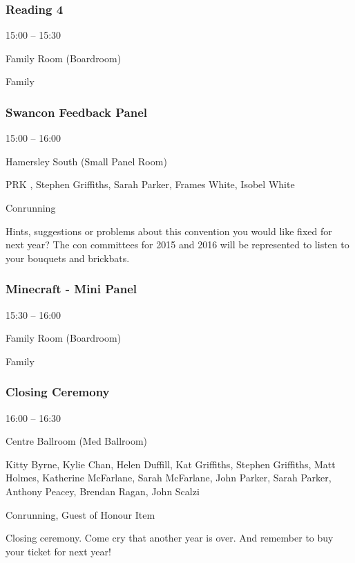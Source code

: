 \documentclass{scrreprt}
\begin{document}
\begin{multicols}{2}
\subsubsection*{Reading 4}\begin{description}
\setlength{\itemsep}{0pt}
\setlength{\parsep}{0pt}
\setlength{\parskip}{0pt}
\item[Time:]{15:00 -- 15:30}
\item[Venue:]{Family Room (Boardroom)}
\item[Tags:]{Family}\end{description}

\subsubsection*{Swancon Feedback Panel}\begin{description}
\setlength{\itemsep}{0pt}
\setlength{\parsep}{0pt}
\setlength{\parskip}{0pt}
\item[Time:]{15:00 -- 16:00}
\item[Venue:]{Hamersley South (Small Panel Room)}
\item[People:]{PRK , Stephen Griffiths, Sarah Parker, Frames White, Isobel White}
\item[Tags:]{Conrunning}\end{description}
Hints, suggestions or problems about this convention you would like fixed for next year? The con committees for 2015 and 2016 will be represented to listen to your bouquets and brickbats.
\subsubsection*{Minecraft - Mini Panel}\begin{description}
\setlength{\itemsep}{0pt}
\setlength{\parsep}{0pt}
\setlength{\parskip}{0pt}
\item[Time:]{15:30 -- 16:00}
\item[Venue:]{Family Room (Boardroom)}
\item[Tags:]{Family}\end{description}

\subsubsection*{Closing Ceremony}\begin{description}
\setlength{\itemsep}{0pt}
\setlength{\parsep}{0pt}
\setlength{\parskip}{0pt}
\item[Time:]{16:00 -- 16:30}
\item[Venue:]{Centre Ballroom (Med Ballroom)}
\item[People:]{Kitty Byrne, Kylie Chan, Helen Duffill, Kat Griffiths, Stephen Griffiths, Matt Holmes, Katherine McFarlane, Sarah McFarlane, John Parker, Sarah Parker, Anthony Peacey, Brendan Ragan, John Scalzi}
\item[Tags:]{Conrunning, Guest of Honour Item}\end{description}
Closing ceremony. Come cry that another year is over. And remember to buy your ticket for next year!

\end{multicols}
\end{document}
